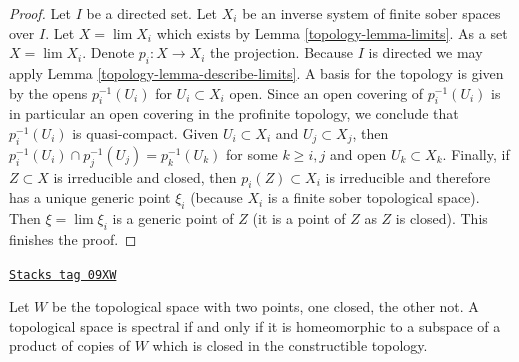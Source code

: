 \begin{proof}

Let $I$ be a directed set. Let $X_i$ be an inverse
system of finite sober spaces over $I$. Let $X = \lim X_i$ which exists
by Lemma \ref{topology-lemma-limits}. As a set $X = \lim X_i$. Denote
$p_i : X \to X_i$ the projection.
Because $I$ is directed we may apply Lemma \ref{topology-lemma-describe-limits}.
A basis for the topology is given by the opens
$p_i^{-1}(U_i)$ for $U_i \subset X_i$ open. Since an open covering of
$p_i^{-1}(U_i)$ is in particular an open covering in the profinite
topology, we conclude that $p_i^{-1}(U_i)$ is quasi-compact.
Given $U_i \subset X_i$ and $U_j \subset X_j$, then
$p_i^{-1}(U_i) \cap p_j^{-1}(U_j) = p_k^{-1}(U_k)$
for some $k \geq i, j$ and open $U_k \subset X_k$. Finally, if $Z \subset X$
is irreducible and closed, then $p_i(Z) \subset X_i$ is irreducible
and therefore has a unique generic point $\xi_i$ (because $X_i$
is a finite sober topological space). Then $\xi = \lim \xi_i$ is a
generic point of $Z$ (it is a point of $Z$ as $Z$ is closed).
This finishes the proof.
\end{proof}

\begin{lemma}
\label{topology-lemma-spectral-closed-in-product-two-point-space}
\href{https://stacks.math.columbia.edu/tag/09XW}{\texttt{Stacks tag 09XW}}

Let $W$ be the topological space with two points, one closed,
the other not. A topological space is spectral if and only if
it is homeomorphic to a subspace of a product of
copies of $W$ which is closed in the constructible topology.
\end{lemma}

